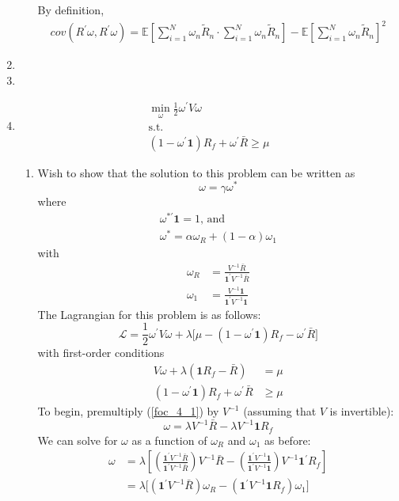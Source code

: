 \documentclass[11pt]{article}
\newcommand{\w}{\omega}
\newcommand{\p}{\prime}
\newcommand{\one}{\mathbf{1}}
\newcommand{\lagr}{\mathcal{L}}
\newcommand{\inv}[1]{#1^{-1}}
\newcommand{\ev}{\mathbb{E}}
\begin{document}
\begin{enumerate}
\begin{enumerate}
		By definition, 
		\begin{align*}
		cov(R^\p \w, R^\p \w) = \ev\left[\sum_{i = 1}^N \w_n \tilde{R}_n \cdot \sum_{i = 1}^N \w_n \tilde{R}_n\right] - \ev\left[\sum_{i = 1}^N \w_n \tilde{R}_n\right]^2
		\end{align*}
	\end{enumerate}
	\item 
	\item 
	\item 
	\begin{gather*}
	\min_\w \frac{1}{2}\w^\p V \w \\
	\text{s.t.} \\
	(1 - \w^\p \one)R_f + \w^\p \bar{R} \geq \mu
	\end{gather*}
	\begin{enumerate}
		\item Wish to show that the solution to this problem can be written as 
		\[\w = \gamma \w^*\]
		where 
		\begin{gather*}
			\w^{*\p}\one = 1\text{, and} \\
			\w^* = \alpha \w_R + (1 - \alpha)\w_1
		\end{gather*}
		with 
		\begin{align*}
		\w_R &= \frac{\inv{V}\bar{R}}{\one^\p \inv{V} \bar{R}} \\
		\w_1 &= \frac{\inv{V} \one}{\one^\p \inv{V} \one}
		\end{align*}
		The Lagrangian for this problem is as follows:
		\[\lagr = \frac{1}{2}\w^\p V \w + \lambda \big[\mu - (1 - \w^\p \one)R_f - \w^\p \bar{R}\big] \]
		with first-order conditions
		\begin{align}
		V\w + \lambda(\one R_f - \bar{R}) &= \mu \label{foc_4_1}\\
		(1 - \w^\p \one)R_f + \w^\p \bar{R} &\geq \mu \label{foc_4_2}
		\end{align}
		To begin, premultiply (\ref{foc_4_1}) by $ \inv{V} $ (assuming that $ V $ is invertible):
		\[\w = \lambda \inv{V} \bar{R} - \lambda \inv{V} \one R_f\]
		We can solve for $ \w $ as a function of $ \w_R $ and $ \w_1 $ as before:
		\begin{align*}
		\w &= \lambda \left[\left(\frac{\one^\p \inv{V} \bar{R}}{\one^\p \inv{V} \bar{R}}\right)\inv{V}\bar{R} - \left(\frac{\one^\p \inv{V} \one}{\one^\p \inv{V} \one}\right)\inv{V}\one^\p R_f\right] \\
		&= \lambda \big[(\one^\p \inv{V}\bar{R})\w_R - (\one^\p \inv{V}\one R_f)\w_1\big]
		\end{align*}
		
	\end{enumerate}
\end{enumerate}
\end{document}
